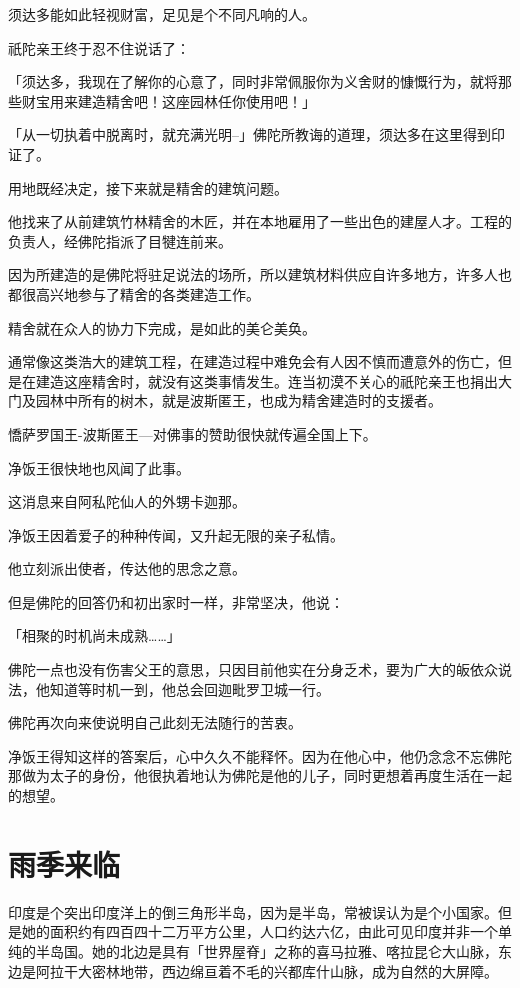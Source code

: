 \documentclass[twoside,openany]{book}
\begin{document}
须达多能如此轻视财富，足见是个不同凡响的人。

祇陀亲王终于忍不住说话了：

「须达多，我现在了解你的心意了，同时非常佩服你为义舍财的慷慨行为，就将那些财宝用来建造精舍吧！这座园林任你使用吧！」

「从一切执着中脱离时，就充满光明--」佛陀所教诲的道理，须达多在这里得到印证了。

用地既经决定，接下来就是精舍的建筑问题。

他找来了从前建筑竹林精舍的木匠，并在本地雇用了一些出色的建屋人才。工程的负责人，经佛陀指派了目犍连前来。

因为所建造的是佛陀将驻足说法的场所，所以建筑材料供应自许多地方，许多人也都很高兴地参与了精舍的各类建造工作。

精舍就在众人的协力下完成，是如此的美仑美奂。

通常像这类浩大的建筑工程，在建造过程中难免会有人因不慎而遭意外的伤亡，但是在建造这座精舍时，就没有这类事情发生。连当初漠不关心的祇陀亲王也捐出大门及园林中所有的树木，就是波斯匿王，也成为精舍建造时的支援者。

憍萨罗国王-波斯匿王—对佛事的赞助很快就传遍全国上下。

净饭王很快地也风闻了此事。

这消息来自阿私陀仙人的外甥卡迦那。

净饭王因着爱子的种种传闻，又升起无限的亲子私情。

他立刻派出使者，传达他的思念之意。

但是佛陀的回答仍和初出家时一样，非常坚决，他说：

「相聚的时机尚未成熟……」

佛陀一点也没有伤害父王的意思，只因目前他实在分身乏术，要为广大的皈依众说法，他知道等时机一到，他总会回迦毗罗卫城一行。

佛陀再次向来使说明自己此刻无法随行的苦衷。

净饭王得知这样的答案后，心中久久不能释怀。因为在他心中，他仍念念不忘佛陀那做为太子的身份，他很执着地认为佛陀是他的儿子，同时更想着再度生活在一起的想望。

\section{雨季来临}\label{sec6.2}

印度是个突出印度洋上的倒三角形半岛，因为是半岛，常被误认为是个小国家。但是她的面积约有四百四十二万平方公里，人口约达六亿，由此可见印度并非一个单纯的半岛国。她的北边是具有「世界屋脊」之称的喜马拉雅、喀拉昆仑大山脉，东边是阿拉干大密林地带，西边绵亘着不毛的兴都库什山脉，成为自然的大屏障。
\end{document}
